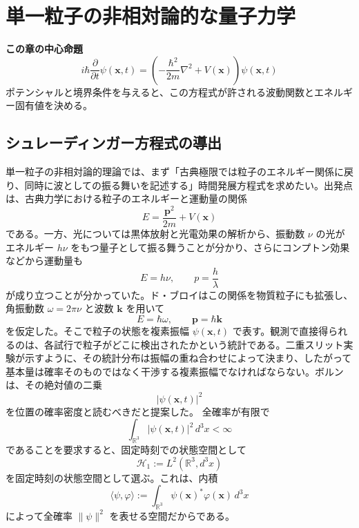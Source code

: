 \section{単一粒子の非相対論的な量子力学}

\noindent\textbf{この章の中心命題}
\[
\boxed{
i\hbar\frac{\partial}{\partial t}\psi(\mathbf{x},t)
=
\left(
-\frac{\hbar^2}{2m}\nabla^2+V(\mathbf{x})
\right)\psi(\mathbf{x},t)
}
\]
ポテンシャルと境界条件を与えると、この方程式が許される波動関数とエネルギー固有値を決める。

\subsection{シュレーディンガー方程式の導出}
単一粒子の非相対論的理論では、まず「古典極限では粒子のエネルギー関係に戻り、同時に波としての振る舞いを記述する」時間発展方程式を求めたい。出発点は、古典力学における粒子のエネルギーと運動量の関係
\begin{equation}
    E = \frac{\mathbf{p}^2}{2m} + V(\mathbf{x})
\end{equation}
である。一方、光については黒体放射と光電効果の解析から、振動数 $\nu$ の光がエネルギー $h\nu$ をもつ量子として振る舞うことが分かり、さらにコンプトン効果などから運動量も
\[
E = h\nu,\qquad p=\frac{h}{\lambda}
\]
が成り立つことが分かっていた。ド・ブロイはこの関係を物質粒子にも拡張し、角振動数 $\omega=2\pi\nu$ と波数 $\mathbf{k}$ を用いて
\[
E = \hbar \omega,\qquad \mathbf{p} = \hbar \mathbf{k}
\]
を仮定した。そこで粒子の状態を複素振幅 $\psi(\mathbf{x},t)$ で表す。観測で直接得られるのは、各試行で粒子がどこに検出されたかという統計である。二重スリット実験が示すように、その統計分布は振幅の重ね合わせによって決まり、したがって基本量は確率そのものではなく干渉する複素振幅でなければならない。ボルンは、その絶対値の二乗
\[
|\psi(\mathbf{x},t)|^2
\]
を位置の確率密度と読むべきだと提案した。
全確率が有限で
\[
\int_{\mathbb{R}^3} |\psi(\mathbf{x},t)|^2\,d^3x < \infty
\]
であることを要求すると、固定時刻での状態空間として
\[
\mathcal{H}_1 := L^2(\mathbb{R}^3,d^3x)
\]
を固定時刻の状態空間として選ぶ。これは、内積
\[
\langle \psi,\varphi\rangle
:=
\int_{\mathbb{R}^3}\psi(\mathbf{x})^*\varphi(\mathbf{x})\,d^3x
\]
によって全確率 $\|\psi\|^2$ を表せる空間だからである。

